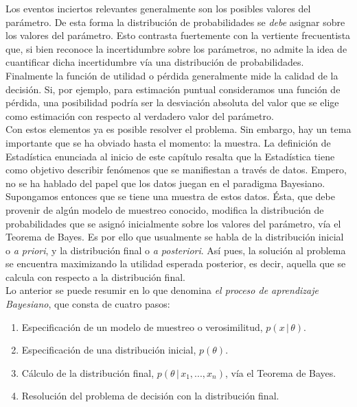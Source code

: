 Los eventos inciertos relevantes generalmente son los posibles valores del parámetro. De esta forma la distribución de probabilidades se \textit{debe} asignar sobre los valores del parámetro. Esto contrasta fuertemente con la vertiente frecuentista que, si bien reconoce la incertidumbre sobre los parámetros, no admite la idea de cuantificar dicha incertidumbre vía una distribución de probabilidades. \\



Finalmente la función de utilidad o pérdida generalmente mide la calidad de la decisión. Si, por ejemplo, para estimación puntual consideramos una función de pérdida, una posibilidad podría ser la desviación absoluta del valor que se elige como estimación con respecto al verdadero valor del parámetro. \\



Con estos elementos ya es posible resolver el problema. Sin embargo, hay un tema importante que se ha obviado hasta el momento: la muestra. La definición de Estadística enunciada al inicio de este capítulo resalta que la Estadística tiene como objetivo describir fenómenos que se manifiestan a través de datos. Empero, no se ha hablado del papel que los datos juegan en el paradigma Bayesiano. Supongamos entonces que se tiene una muestra de estos datos. Ésta, que debe provenir de algún modelo de muestreo conocido, modifica la distribución de probabilidades que se asignó inicialmente sobre los valores del parámetro, vía el Teorema de Bayes. Es por ello que usualmente se habla de la distribución inicial o \textit{a priori}, y la distribución final o \textit{a posteriori}. Así pues, la solución al problema se encuentra maximizando la utilidad esperada posterior, es decir, aquella que se calcula con respecto a la distribución final. \\



Lo anterior se puede resumir en lo que \cite{notas_bayes_egp} denomina \textit{el proceso de aprendizaje Bayesiano}, que consta de cuatro pasos:
\begin{enumerate}
\item Especificación de un modelo de muestreo o verosimilitud, $p(x \, | \, \theta)$.
\item Especificación de una distribución inicial, $p(\theta)$.
\item Cálculo de la distribución final, $p(\theta \, | \, x_1, ..., x_n)$, vía el Teorema de Bayes.
\item Resolución del problema de decisión con la distribución final.
\end{enumerate}


